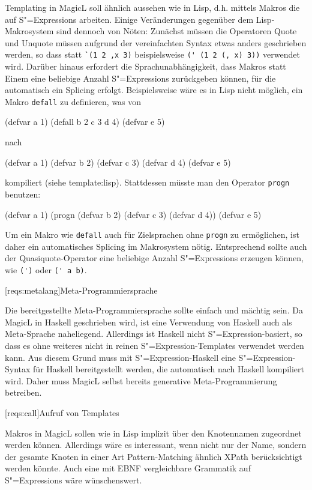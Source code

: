 \documentclass[12pt, a4paper, bibgerm]{scrbook}
\newcommand\icode[1]{\lstinline?#1?}
\newcommand\lsection{}
\newcommand\sref{}
\newcommand{\sees}[1]{(siehe \sref{#1})}
\newcommand{\sexp}{S"=Expression}
\newcommand{\sexps}{S"=Expressions}
\begin{document}
Templating in MagicL soll ähnlich aussehen wie in Lisp, d.h. mittels
Makros die auf \sexps{} arbeiten. Einige Veränderungen gegenüber dem
Lisp-Makrosystem sind dennoch von Nöten: Zunächst müssen die Operatoren
Quote und Unquote müssen aufgrund der vereinfachten Syntax etwas anders
geschrieben werden, so dass statt \icode{`(1 2 ,x 3)} beispielsweise
\icode{(' (1 2 (, x) 3))} verwendet wird. Darüber hinaus erfordert die
Sprachunabhängigkeit, dass Makros statt Einem eine beliebige Anzahl
\sexps{} zurückgeben können, für die automatisch ein Splicing
erfolgt. Beispielsweise wäre es in Lisp nicht möglich, ein Makro
\icode{defall} zu definieren, was von
\begin{code}
(defvar a 1)
(defall b 2 c 3 d 4)
(defvar e 5)
\end{code}
nach
\begin{code}
(defvar a 1)
(defvar b 2)
(defvar c 3)
(defvar d 4)
(defvar e 5)  
\end{code}
kompiliert \sees{template:lisp}. Stattdessen müsste man den Operator
\icode{progn} benutzen:
\begin{code}
(defvar a 1)
(progn
  (defvar b 2)
  (defvar c 3)
  (defvar d 4))
(defvar e 5)  
\end{code}
Um ein Makro wie \icode{defall} auch für Zielsprachen ohne \icode{progn} zu
ermöglichen, ist daher ein automatisches Splicing im Makrosystem
nötig. Entsprechend sollte auch der Quasiquote-Operator eine beliebige
Anzahl \sexps{} erzeugen können, wie \icode{(')} oder \icode{(' a b)}.

\lsection[reqs:metalang]{Meta-Programmiersprache}

Die bereitgestellte Meta-Programmiersprache sollte einfach und mächtig
sein. Da MagicL in Haskell geschrieben wird, ist eine Verwendung von
Haskell auch als Meta-Sprache naheliegend. Allerdings ist Haskell nicht
\sexp{}-basiert, so dass es ohne weiteres nicht in reinen
\sexp{}-Templates verwendet werden kann. Aus diesem Grund muss mit
\sexp{}-Haskell eine \sexp{}-Syntax für Haskell bereitgestellt werden,
die automatisch nach Haskell kompiliert wird. Daher muss MagicL selbst
bereits generative Meta-Programmierung betreiben.

\lsection[reqs:call]{Aufruf von Templates}

Makros in MagicL sollen wie in Lisp implizit über den Knotennamen
zugeordnet werden können. Allerdings wäre es interessant, wenn nicht nur
der Name, sondern der gesamte Knoten in einer Art Pattern-Matching
ähnlich XPath berücksichtigt werden könnte. Auch eine mit EBNF
\cite[S.43f]{EBNF} vergleichbare Grammatik auf \sexps{} wäre
wünschenswert. 
\end{document}
